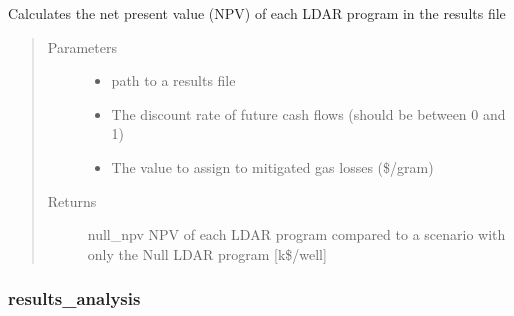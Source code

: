 \documentclass[letterpaper,10pt,english]{sphinxmanual}
\begin{document}
\begin{fulllineitems}
\label{\detokenize{index:feast.ResultsProcessing.results_analysis_functions.npv_calculator_json}}
Calculates the net present value (NPV) of each LDAR program in the results file
\begin{quote}\begin{description}
\item[{Parameters}] \leavevmode\begin{itemize}
\item {} 
 \textendash{} path to a results file

\item {} 
 \textendash{} The discount rate of future cash flows (should be between 0 and 1)

\item {} 
 \textendash{} The value to assign to mitigated gas losses (\$/gram)

\end{itemize}

\item[{Returns}] \leavevmode
null\_npv          NPV of each LDAR program compared to a scenario with only the Null LDAR program {[}k\$/well{]}

\end{description}\end{quote}

\end{fulllineitems}



\subsubsection{results\_analysis}
\label{\detokenize{index:results-analysis}}
\end{document}
